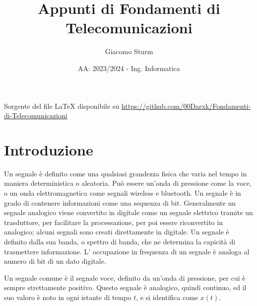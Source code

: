 \documentclass{article}
\title{Appunti di Fondamenti di Telecomunicazioni}
\author{Giacomo Sturm}
\date{AA: 2023/2024 - Ing. Informatica}
\numberwithin{equation}{subsection}
\begin{document}
\maketitle

\vspace{10mm}

\begin{center}
    Sorgente del file LaTeX disponibile su \url{https://github.com/00Darxk/Fondamenti-di-Telecomunicazioni}
\end{center}

\clearpage

\tableofcontents

\clearpage

\section{Introduzione}

Un segnale è definito come una qualsiasi grandezza fisica che varia nel tempo in maniera deterministica o aleatoria. Può essere un'onda di pressione come la voce, o un onda 
elettromagnetica come segnali wireless e bluetooth. Un segnale è in grado di contenere informazioni come una sequenza di bit. Generalmente un segnale 
analogico viene convertito in digitale come un segnale elettrico tramite un trasduttore, per facilitare la processazione, per poi essere riconvertito in analogico; alcuni 
segnali sono creati direttamente in digitale. Un segnale è definito dalla sua banda, o spettro di banda, che ne determina la capicità di trasmettere informazione. L' 
occupazione in frequenza di un segnale è analoga al numero di bit di un dato digitale. 



Un segnale comune è il segnale voce, definito da un'onda di pressione, per cui è sempre strettamente positivo. Questo segnale è analogico, quindi continuo, ed il suo valoro è 
noto in ogni istante di tempo $t$, e si identifica come $x(t)$. 

\begin{center}
\end{center}
\end{document}

